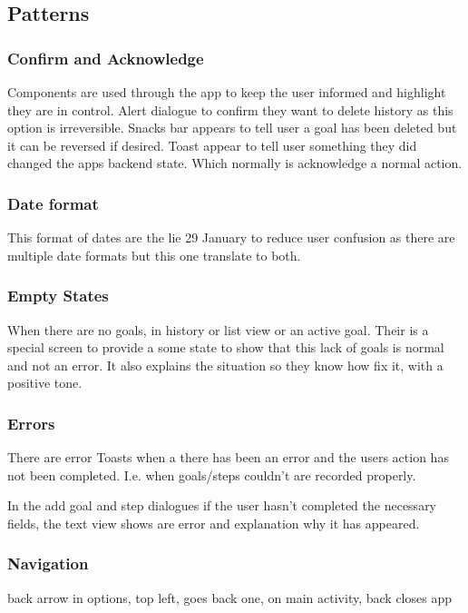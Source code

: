 \documentclass[12pt]{report}
\begin{document}
\subsection{Patterns}

\subsubsection{Confirm and Acknowledge}
Components are used through the app to keep the user informed and highlight they are in control.
Alert dialogue to confirm they want to delete history as this option is irreversible. 
Snacks bar appears to tell user a goal has been deleted but it can be reversed if desired.
Toast appear to tell user something they did changed the apps backend state. Which normally is acknowledge a normal action.

\subsubsection{Date format }
This format of dates are the lie 29 January to reduce user confusion as there are multiple date formats but this one translate to both.

\subsubsection{Empty States}
When there are no goals, in history or list view or an active goal. Their is a special screen to provide a some state to show that this lack of goals is normal and not an error. It also explains the situation so they know how fix it, with a positive tone. 

\subsubsection{Errors}
There are error Toasts when a there has been an error and the users action has not been completed. I.e. when goals/steps couldn’t are recorded properly.

In the add goal and step dialogues if the user hasn't completed the necessary fields, the text view shows are error and explanation why it has appeared.

\subsubsection{\textbf{Navigation}}
back arrow in options, top left, goes back one,
on main activity, back closes app
\end{document}
